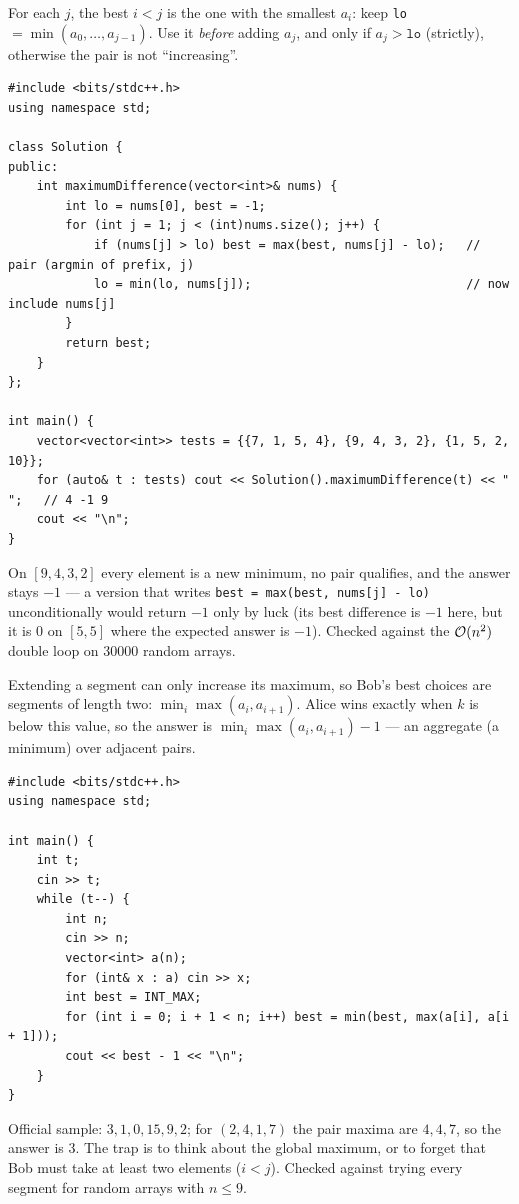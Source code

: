 \begin{solutionbox}
For each $j$, the best $i < j$ is the one with the smallest $a_i$: keep \texttt{lo} $= \min(a_0, \dots, a_{j-1})$. Use it \emph{before} adding $a_j$, and only if $a_j > \texttt{lo}$ (strictly), otherwise the pair is not ``increasing''.
\begin{lstlisting}[style=cpp]
#include <bits/stdc++.h>
using namespace std;

class Solution {
public:
    int maximumDifference(vector<int>& nums) {
        int lo = nums[0], best = -1;
        for (int j = 1; j < (int)nums.size(); j++) {
            if (nums[j] > lo) best = max(best, nums[j] - lo);   // pair (argmin of prefix, j)
            lo = min(lo, nums[j]);                              // now include nums[j]
        }
        return best;
    }
};

int main() {
    vector<vector<int>> tests = {{7, 1, 5, 4}, {9, 4, 3, 2}, {1, 5, 2, 10}};
    for (auto& t : tests) cout << Solution().maximumDifference(t) << " ";   // 4 -1 9
    cout << "\n";
}
\end{lstlisting}
On $[9, 4, 3, 2]$ every element is a new minimum, no pair qualifies, and the answer stays $-1$ --- a version that writes \texttt{best = max(best, nums[j] - lo)} unconditionally would return $-1$ only by luck (its best difference is $-1$ here, but it is $0$ on $[5,5]$ where the expected answer is $-1$). Checked against the $\mathcal{O}(n^2)$ double loop on 30000 random arrays.
\end{solutionbox}

\begin{solutionbox}
Extending a segment can only increase its maximum, so Bob's best choices are segments of length two: $\min_i \max(a_i, a_{i+1})$. Alice wins exactly when $k$ is below this value, so the answer is $\min_i \max(a_i, a_{i+1}) - 1$ --- an aggregate (a minimum) over adjacent pairs.
\begin{lstlisting}[style=cpp]
#include <bits/stdc++.h>
using namespace std;

int main() {
    int t;
    cin >> t;
    while (t--) {
        int n;
        cin >> n;
        vector<int> a(n);
        for (int& x : a) cin >> x;
        int best = INT_MAX;
        for (int i = 0; i + 1 < n; i++) best = min(best, max(a[i], a[i + 1]));
        cout << best - 1 << "\n";
    }
}
\end{lstlisting}
Official sample: $3, 1, 0, 15, 9, 2$; for $(2, 4, 1, 7)$ the pair maxima are $4, 4, 7$, so the answer is $3$. The trap is to think about the global maximum, or to forget that Bob must take at least two elements ($i < j$). Checked against trying every segment for random arrays with $n \le 9$.
\end{solutionbox}


